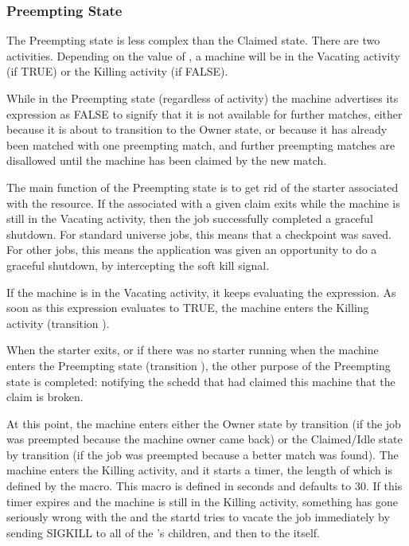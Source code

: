 \subsubsection{\label{sec:Preempting-State}Preempting State}

The Preempting state is less complex than the Claimed state.
There are two activities.
Depending on the value of , a machine will
be in the
Vacating activity (if TRUE) or the Killing activity (if FALSE).  

While in the Preempting state (regardless of activity) the machine
advertises its  expression as FALSE to signify that
it is not available for further matches, either because it is about to
transition
to the Owner state, or because it has already been matched with
one preempting match, and further preempting matches are disallowed
until the machine has been claimed by the new match.

The main function of the Preempting state is to get rid of the starter
associated with the resource.  If the  associated with
a given claim exits while the machine is still in the Vacating
activity, then the job successfully completed a graceful shutdown.
For standard universe jobs, this means that a checkpoint was saved.
For other jobs, this means the application was given an opportunity to
do a graceful shutdown, by intercepting the soft kill signal.

If the machine is in the Vacating activity, it keeps evaluating the 
 expression.
As soon as this expression evaluates to TRUE,
the machine enters the Killing activity (transition ).

When the starter exits, or if there was no starter running when the
machine enters the Preempting state (transition ),
the other purpose of the Preempting state is completed:
notifying the schedd that had claimed this machine that the claim is
broken.

At this point, the machine enters either the Owner state by
transition  (if the job was preempted because the machine
owner came back) or the Claimed/Idle state by transition 
(if the job was preempted because a better match was found).
The machine enters the Killing activity, and it starts a timer, the
length of which is defined by the 
\label{param:KillingTimeout} macro.
This macro is defined in seconds and defaults to 30.
If this timer expires and the machine is still in
the Killing activity, something has gone seriously wrong with the
 and the startd tries to vacate the job immediately by
sending SIGKILL to all of the 's children, and then to
the  itself.


